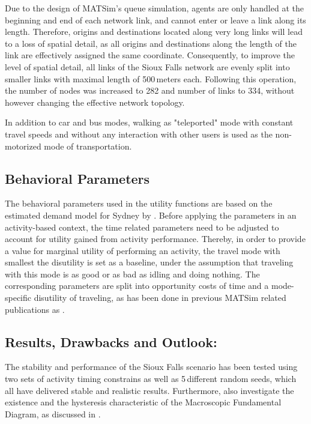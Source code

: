 Due to the design of MATSim’s queue simulation, agents are only handled at the beginning and end of each network link, and cannot enter or leave a link along its length. Therefore, origins and destinations located along very long links will lead to a loss of spatial detail, as all origins and destinations along the length of the link are effectively assigned the same coordinate. Consequently, to improve the level of spatial detail, all links of the Sioux Falls network are evenly split into smaller links with maximal length of 500\,meters each. Following this operation, the number of nodes was increased to 282 and number of links to 334, without however changing the effective network topology.

In addition to car and bus modes, walking as "teleported" mode with constant travel speeds and without any interaction with other users is used as the non-motorized mode of transportation. 

\subsection{Behavioral Parameters}
The behavioral parameters used in the utility functions are based on the estimated demand model for Sydney by \citet[][]{TirachiniHensherRose_TransResB_2014}. Before applying the parameters in an activity-based context, the time related parameters need to be adjusted to account for utility gained from activity performance. Thereby, in order to provide a value for marginal utility of performing an activity, the travel mode with smallest the disutility is set as a baseline, under the assumption that traveling with this mode is as good or as bad as idling and doing nothing. The corresponding parameters are split into opportunity costs of time and a mode-specific disutility of traveling, as has been done in previous MATSim related publications as \citet[e.g,][]{KickhoeferEtAl_Transportation_2011}. 

\subsection{Results, Drawbacks and Outlook:}
The stability and performance of the Sioux Falls scenario has been tested using two sets of activity timing constrains as well as 5\,different random seeds, which all have delivered stable and realistic results. Furthermore, \citet[][]{ChakirovFourie_TechRep_FCL_2014} also investigate the existence and the hysteresis characteristic of the Macroscopic Fundamental Diagram, as discussed in \citet[][]{GeroliminisDaganzo_TRB_2007, GeroliminisDaganzo_TransResB_2008, GeroliminisSun_TransResA_2011}. 

